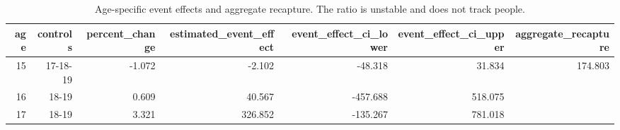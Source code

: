 \begin{table}[!htbp]
\centering
\caption{Age-specific event effects and aggregate recapture. The ratio is unstable and does not track people.} 
\label{tab:delay_recapture}
\begingroup\small
\begin{tabular}{rrrrrrr}
  \hline
age & controls & percent\_change & estimated\_event\_effect & event\_effect\_ci\_lower & event\_effect\_ci\_upper & aggregate\_recapture \\ 
  \hline
  15 & 17-18-19 & -1.072 & -2.102 & -48.318 & 31.834 & 174.803 \\ 
    16 & 18-19 & 0.609 & 40.567 & -457.688 & 518.075 &  \\ 
    17 & 18-19 & 3.321 & 326.852 & -135.267 & 781.018 &  \\ 
   \hline
\end{tabular}
\endgroup
\end{table}
